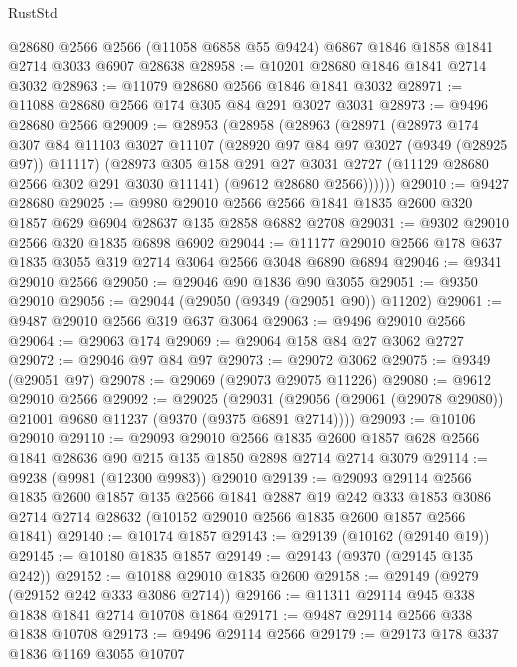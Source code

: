 \begin{lexlean}{RustStd}
\begin{coremodule}
{\begin{coremodule}
{{{{{{{{{{{{{{{{{{{{{{{{{{{{{{{{{{{{{{{    @28680
    @2566
    @2566
    (@11058 @6858 @55 @9424)
    @6867
    @1846
    @1858
    @1841
    @2714
    @3033
    @6907
    @28638
@28958 := @10201 @28680 @1846 @1841 @2714 @3032
@28963 := @11079 @28680 @2566 @1846 @1841 @3032
@28971 := @11088 @28680 @2566 @174 @305 @84 @291 @3027 @3031
@28973 := @9496 @28680 @2566
@29009 := @28953
    (@28958
      (@28963
        (@28971
          (@28973
            @174
            @307
            @84
            @11103
            @3027
            @11107
            (@28920 @97 @84 @97 @3027 (@9349 (@28925 @97)) @11117)
            (@28973
              @305
              @158
              @291
              @27
              @3031
              @2727
              (@11129 @28680 @2566 @302 @291 @3030 @11141)
              (@9612 @28680 @2566))))))
@29010 := @9427 @28680
@29025 := @9980
    @29010
    @2566
    @2566
    @1841
    @1835
    @2600
    @320
    @1857
    @629
    @6904
    @28637
    @135
    @2858
    @6882
    @2708
@29031 := @9302 @29010 @2566 @320 @1835 @6898 @6902
@29044 := @11177 @29010 @2566 @178 @637 @1835 @3055 @319 @2714 @3064 @2566 @3048 @6890 @6894
@29046 := @9341 @29010 @2566
@29050 := @29046 @90 @1836 @90 @3055
@29051 := @9350 @29010
@29056 := @29044 (@29050 (@9349 (@29051 @90)) @11202)
@29061 := @9487 @29010 @2566 @319 @637 @3064
@29063 := @9496 @29010 @2566
@29064 := @29063 @174
@29069 := @29064 @158 @84 @27 @3062 @2727
@29072 := @29046 @97 @84 @97
@29073 := @29072 @3062
@29075 := @9349 (@29051 @97)
@29078 := @29069 (@29073 @29075 @11226)
@29080 := @9612 @29010 @2566
@29092 := @29025
    (@29031 (@29056 (@29061 (@29078 @29080)) @21001 @9680 @11237 (@9370 (@9375 @6891 @2714))))
@29093 := @10106 @29010
@29110 := @29093
    @29010
    @2566
    @1835
    @2600
    @1857
    @628
    @2566
    @1841
    @28636
    @90
    @215
    @135
    @1850
    @2898
    @2714
    @2714
    @3079
@29114 := @9238 (@9981 (@12300 @9983)) @29010
@29139 := @29093
    @29114
    @2566
    @1835
    @2600
    @1857
    @135
    @2566
    @1841
    @2887
    @19
    @242
    @333
    @1853
    @3086
    @2714
    @2714
    @28632
    (@10152 @29010 @2566 @1835 @2600 @1857 @2566 @1841)
@29140 := @10174 @1857
@29143 := @29139 (@10162 (@29140 @19))
@29145 := @10180 @1835 @1857
@29149 := @29143 (@9370 (@29145 @135 @242))
@29152 := @10188 @29010 @1835 @2600
@29158 := @29149 (@9279 (@29152 @242 @333 @3086 @2714))
@29166 := @11311 @29114 @945 @338 @1838 @1841 @2714 @10708 @1864
@29171 := @9487 @29114 @2566 @338 @1838 @10708
@29173 := @9496 @29114 @2566
@29179 := @29173 @178 @337 @1836 @1169 @3055 @10707
}}}}}}}}}}}}}}}}}}}}}}}}}}}}}}}}}}}}}}}
\end{coremodule}}
\end{coremodule}
\end{lexlean}
